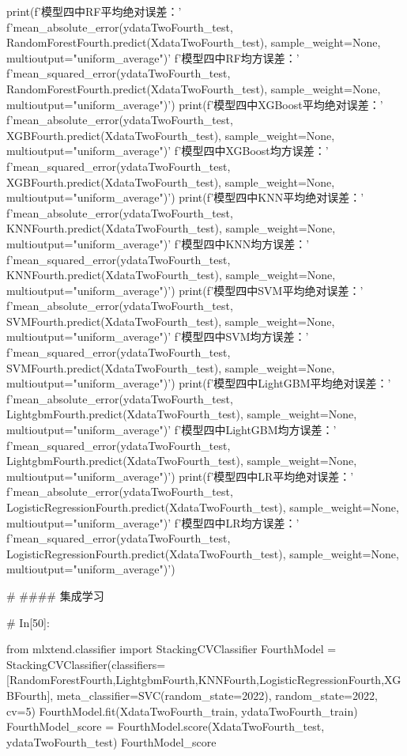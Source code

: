 \documentclass{MathorCupmodeling}
\begin{document}
\begin{python}
print(f'模型四中RF平均绝对误差：'
      f'{mean_absolute_error(ydataTwoFourth_test, RandomForestFourth.predict(XdataTwoFourth_test), sample_weight=None, multioutput="uniform_average")}\n'
      f'模型四中RF均方误差：'
      f'{mean_squared_error(ydataTwoFourth_test, RandomForestFourth.predict(XdataTwoFourth_test), sample_weight=None, multioutput="uniform_average")}')
print(f'模型四中XGBoost平均绝对误差：'
      f'{mean_absolute_error(ydataTwoFourth_test, XGBFourth.predict(XdataTwoFourth_test), sample_weight=None, multioutput="uniform_average")}\n'
      f'模型四中XGBoost均方误差：'
      f'{mean_squared_error(ydataTwoFourth_test, XGBFourth.predict(XdataTwoFourth_test), sample_weight=None, multioutput="uniform_average")}')
print(f'模型四中KNN平均绝对误差：'
      f'{mean_absolute_error(ydataTwoFourth_test, KNNFourth.predict(XdataTwoFourth_test), sample_weight=None, multioutput="uniform_average")}\n'
      f'模型四中KNN均方误差：'
      f'{mean_squared_error(ydataTwoFourth_test, KNNFourth.predict(XdataTwoFourth_test), sample_weight=None, multioutput="uniform_average")}')
print(f'模型四中SVM平均绝对误差：'
      f'{mean_absolute_error(ydataTwoFourth_test, SVMFourth.predict(XdataTwoFourth_test), sample_weight=None, multioutput="uniform_average")}\n'
      f'模型四中SVM均方误差：'
      f'{mean_squared_error(ydataTwoFourth_test, SVMFourth.predict(XdataTwoFourth_test), sample_weight=None, multioutput="uniform_average")}')
print(f'模型四中LightGBM平均绝对误差：'
      f'{mean_absolute_error(ydataTwoFourth_test, LightgbmFourth.predict(XdataTwoFourth_test), sample_weight=None, multioutput="uniform_average")}\n'
      f'模型四中LightGBM均方误差：'
      f'{mean_squared_error(ydataTwoFourth_test, LightgbmFourth.predict(XdataTwoFourth_test), sample_weight=None, multioutput="uniform_average")}')
print(f'模型四中LR平均绝对误差：'
      f'{mean_absolute_error(ydataTwoFourth_test, LogisticRegressionFourth.predict(XdataTwoFourth_test), sample_weight=None, multioutput="uniform_average")}\n'
      f'模型四中LR均方误差：'
      f'{mean_squared_error(ydataTwoFourth_test, LogisticRegressionFourth.predict(XdataTwoFourth_test), sample_weight=None, multioutput="uniform_average")}')


# #### 集成学习

# In[50]:


from mlxtend.classifier import StackingCVClassifier
FourthModel = StackingCVClassifier(classifiers=[RandomForestFourth,LightgbmFourth,KNNFourth,LogisticRegressionFourth,XGBFourth], meta_classifier=SVC(random_state=2022), random_state=2022, cv=5)
FourthModel.fit(XdataTwoFourth_train, ydataTwoFourth_train)
FourthModel_score = FourthModel.score(XdataTwoFourth_test, ydataTwoFourth_test)
FourthModel_score



\end{python}
\end{document}
